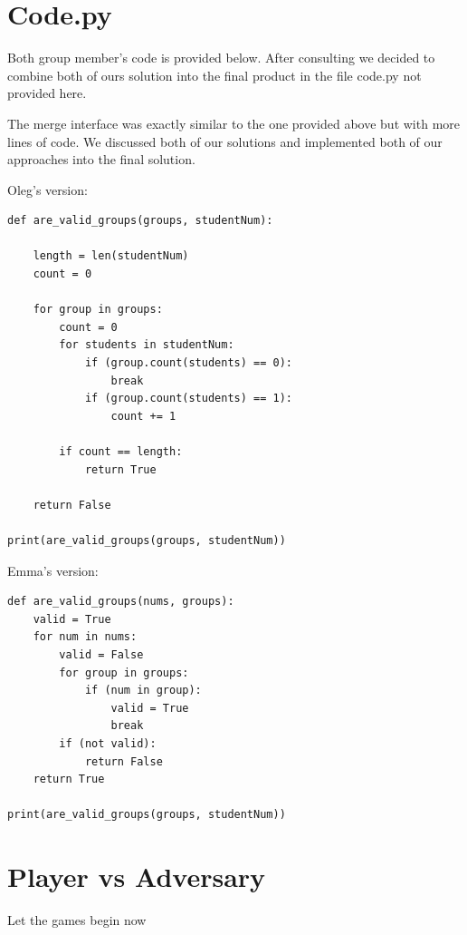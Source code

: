 \documentclass[twocolumn, 10pt]{article}
\begin{document}
\section{Code.py}

Both group member's code is provided below. After consulting we decided to combine both of ours solution into the final product in the file code.py not provided here.

The merge interface was exactly similar to the one provided above but with more lines of code. We discussed both of our solutions and implemented both of our approaches into the final solution.

Oleg's version:

\footnotesize
\begin{verbatim}
def are_valid_groups(groups, studentNum):

    length = len(studentNum)
    count = 0
    
    for group in groups:
        count = 0
        for students in studentNum:
            if (group.count(students) == 0):
                break
            if (group.count(students) == 1):
                count += 1
        
        if count == length:
            return True
        
    return False

print(are_valid_groups(groups, studentNum))
\end{verbatim}
\normalsize

Emma's version:

\footnotesize
\begin{verbatim}
def are_valid_groups(nums, groups):
    valid = True
    for num in nums:
        valid = False
        for group in groups:
            if (num in group): 
                valid = True
                break
        if (not valid):
            return False
    return True

print(are_valid_groups(groups, studentNum))
\end{verbatim}
\normalsize

\section{Player vs Adversary}
Let the games begin now
\end{document}
